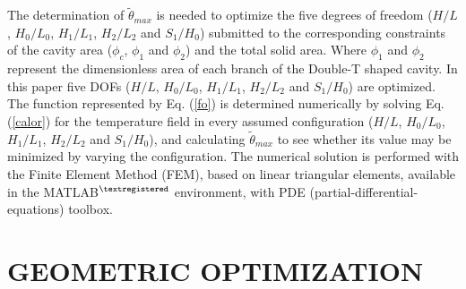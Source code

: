 \documentclass[12pt,fleqn]{article}
\begin{document}
The determination of $\tilde{\theta}_{max}$ is needed to optimize the five degrees of freedom ($H/L$, $H_{0}/L_{0}$, $H_{1}/L_{1}$, $H_{2}/L_{2}$ and $S_{1}/H_{0}$) submitted to the corresponding constraints of the cavity area ($\phi_{c}$, $\phi_{1}$ and $\phi_{2}$) and the total solid area. Where $\phi_{1}$ and $\phi_{2}$ represent the dimensionless area of each branch of the Double-T shaped cavity. In this paper five DOFs ($H/L$, $H_{0}/L_{0}$, $H_{1}/L_{1}$, $H_{2}/L_{2}$ and $S_{1}/H_{0}$) are optimized. The function represented by Eq. (\ref{fo}) is determined numerically by solving Eq. (\ref{calor}) for the temperature field in every assumed configuration ($H/L$, $H_{0}/L_{0}$, $H_{1}/L_{1}$, $H_{2}/L_{2}$ and $S_{1}/H_{0}$), and calculating $\tilde{\theta}_{max}$ to see whether its value may be minimized by varying the configuration. The numerical solution is performed with the Finite Element Method (FEM)\citep{Reddy1994}, based on linear triangular elements, available in the MATLAB$^{\tiny ®}$ environment, with PDE (partial-differential-equations) toolbox. 


\section{GEOMETRIC OPTIMIZATION}
\end{document}
